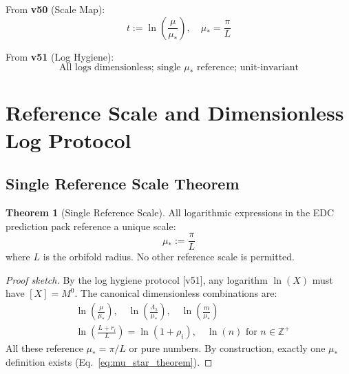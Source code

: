 \documentclass[11pt,a4paper]{article}
\theoremstyle{definition}
\newtheorem{theorem}{Theorem}[section]
\begin{document}
From \textbf{v50} (Scale Map):
\begin{equation}
\label{eq:import_v50}
t := \ln\left(\frac{\mu}{\mu_*}\right), \quad \mu_* = \frac{\pi}{L}
\end{equation}

From \textbf{v51} (Log Hygiene):
\begin{equation}
\label{eq:import_v51}
\text{All logs dimensionless; single } \mu_* \text{ reference; unit-invariant}
\end{equation}

\section{Reference Scale and Dimensionless Log Protocol}
\label{sec:log_protocol}

\subsection{Single Reference Scale Theorem}
\label{subsec:single_ref}

\begin{theorem}[Single Reference Scale]
\label{thm:single_ref}
All logarithmic expressions in the EDC prediction pack reference a unique scale:
\begin{equation}
\label{eq:mu_star_theorem}
\mu_* := \frac{\pi}{L}
\end{equation}
where $L$ is the orbifold radius. No other reference scale is permitted.
\end{theorem}

\begin{proof}[Proof sketch]
By the log hygiene protocol [v51], any logarithm $\ln(X)$ must have $[X] = M^0$.
The canonical dimensionless combinations are:
\begin{align}
\label{eq:log_forms_1}
&\ln\left(\frac{\mu}{\mu_*}\right), \quad \ln\left(\frac{\Lambda_5}{\mu_*}\right), \quad \ln\left(\frac{m}{\mu_*}\right) \\
\label{eq:log_forms_2}
&\ln\left(\frac{L + r_i}{L}\right) = \ln(1 + \rho_i), \quad \ln(n) \text{ for } n \in \mathbb{Z}^+
\end{align}
All these reference $\mu_* = \pi/L$ or pure numbers. By construction, exactly one
$\mu_*$ definition exists (Eq.~\ref{eq:mu_star_theorem}).
\end{proof}
\end{document}
